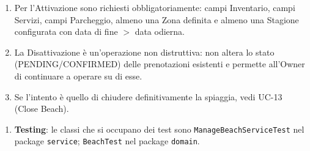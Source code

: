 \documentclass{article}
\begin{document}
	{
		\begin{enumerate}[nosep, leftmargin=*]
			\item[•] Per l'Attivazione sono richiesti obbligatoriamente: campi Inventario, campi Servizi, campi Parcheggio, almeno una Zona definita e almeno una Stagione configurata con data di fine $>$ data odierna.
			\item[•] La Disattivazione è un'operazione non distruttiva: non altera lo stato (PENDING/CONFIRMED) delle prenotazioni esistenti e permette all'Owner di continuare a operare su di esse.
			\item[•] Se l'intento è quello di chiudere definitivamente la spiaggia, vedi UC-13 (Close Beach).
		\end{enumerate}
		
		\begin{enumerate}[leftmargin=*]
			\item[•] \textbf{Testing}: le classi che si occupano dei test sono \texttt{ManageBeachServiceTest} nel package \texttt{service}; \texttt{BeachTest} nel package \texttt{domain}.
		\end{enumerate}
	}
		
	\newpage
	
\end{document}

